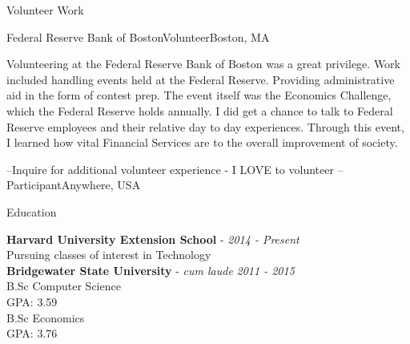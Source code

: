 \documentclass{resume} %
\begin{document}
\begin{rSection}{Volunteer Work}

\begin{rSubsection}{Federal Reserve Bank of Boston}{}{Volunteer}{Boston, MA}
 	       \item Volunteering at the Federal Reserve Bank of Boston was a great privilege. Work included handling events held at the Federal Reserve. Providing administrative aid in the form of contest prep. The event itself was the Economics Challenge, which the Federal Reserve holds annually. I did get a chance to talk to Federal Reserve employees and their relative day to day experiences. Through this event, I learned how vital Financial Services are to the overall improvement of society.
 	 \end{rSubsection}	     


\begin{rSubsection}{--Inquire for additional volunteer experience - I LOVE to volunteer --}{}{Participant}{Anywhere, USA}
 	       \item 
\end{rSubsection}



\end{rSection}



\begin{rSection}{Education}

{\bf Harvard University Extension School} - {\em 2014 - Present} \vspace{0.5em}\\ 
Pursuing classes of interest in Technology \\

{\bf Bridgewater State University} - \textit{cum laude} \hfill {\em 2011 - 2015} \vspace{0.5em}\\ 
B.Sc Computer Science \\
GPA: 3.59 \vspace{0.5em}\\
B.Sc Economics \\
GPA: 3.76

\end{rSection}
\end{document}

